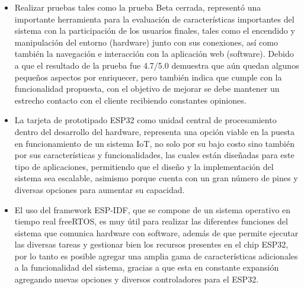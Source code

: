 \begin{itemize}
	\item Realizar pruebas tales como la prueba Beta cerrada, representó una importante herramienta para la evaluación de características importantes del sistema con la participación de los usuarios finales, tales como el encendido y manipulación del entorno (hardware) junto con sus conexiones, así como también la navegación e interacción con la aplicación web (software). Debido a que el resultado de la prueba fue 4.7/5.0 demuestra que aún quedan algunos pequeños aspectos por enriquecer, pero también indica que cumple con la funcionalidad propuesta, con el objetivo de mejorar se debe mantener un estrecho contacto con el cliente recibiendo constantes opiniones.\\
	
	\item La tarjeta de prototipado ESP32 como unidad central de procesamiento dentro del desarrollo del hardware, representa una opción viable en la puesta en funcionamiento de un sistema IoT, no solo por su bajo costo sino también por sus características y funcionalidades, las cuales están diseñadas para este tipo de aplicaciones, permitiendo que el diseño y la implementación del sistema sea escalable, asimismo porque cuenta con un gran número de pines y diversas opciones para aumentar su capacidad.\\
	
	\item El uso del framework ESP-IDF, que se compone de un sistema operativo en tiempo real freeRTOS, es muy útil para realizar las diferentes funciones del sistema que comunica hardware con software, además de que permite ejecutar las diversas tareas y gestionar bien los recursos presentes en el chip ESP32, por lo tanto es posible agregar una amplia gama de características adicionales a la funcionalidad del sistema, gracias a que esta en constante expansión agregando nuevas opciones y diversos controladores para el ESP32.\\
	
\end{itemize}